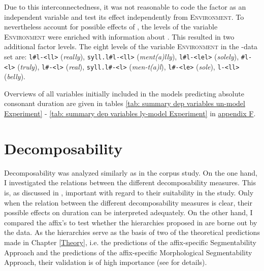  Due to this interconnectedness, it was not reasonable to code the factor  as an independent variable and test its effect independently from \textsc{Environment}. 
 To nevertheless account for possible effects of , the levels of the variable \textsc{Environment} were enriched with information about . 
This resulted in two additional factor levels.
   The eight levels of the variable \textsc{Environment} in the -data set are: \texttt{l\#l-<ll>} (\textit{really}), \texttt{syll.l\#l-<ll>} (\textit{ment(a)lly}), \texttt{l\#l-<lel>} (\textit{solely}), \texttt{\#l-<l>} (\textit{truly}), \texttt{l\#-<l>} (\textit{real}), \texttt{syll.l\#-<l>} (\textit{men-t(a)l}),  \texttt{l\#-<le>} (\textit{sole}), \texttt{l-<ll> }(\textit{belly}). 		

Overviews of all variables initially included in the models predicting absolute consonant duration are given in tables \ref{tab: summary dep variables un-model Experiment} - \ref{tab: summary dep variables ly-model Experiment} in \hyperref[Appendix F Summaries of variables in initial models of experimental study]{appendix F}.



\section{Decomposability} \label{decomposability experiment}


 

Decomposability was analyzed similarly as in the corpus study. On the one hand, I investigated the relations between the different decomposability measures. This is, as discussed in , important with regard to their suitability in the study. Only when the relation between the different decomposability measures is clear, their possible effects on duration can be interpreted adequately.  
On the other hand, I compared the affix's  to test whether the  hierarchies proposed in  are borne out by the data.  As the hierarchies serve as the basis of two of the theoretical predictions made in Chapter \ref{Theory}, i.e. the predictions of the affix-specific Segmentability Approach and the predictions of the affix-specific Morphological Segmentability Approach, their validation is of high importance (see  for details). 




